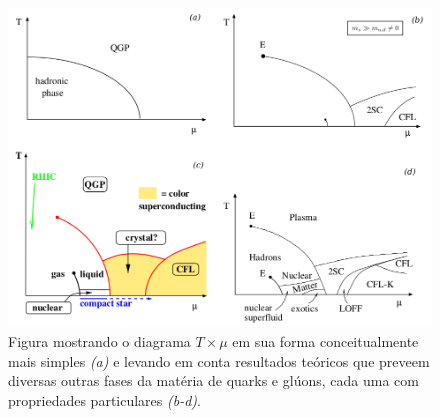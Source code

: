 \begin{figure}
	\includegraphics[width=\textwidth]{Figures/FigBuballa.png}
	\caption{Figura mostrando o diagrama $T\times \mu$ em sua forma conceitualmente mais simples \emph{(a)} e levando em conta resultados teóricos que preveem diversas outras fases da matéria de quarks e glúons, cada uma com propriedades particulares \emph{(b-d)}.}
\label{FigBuballa}
\end{figure}

